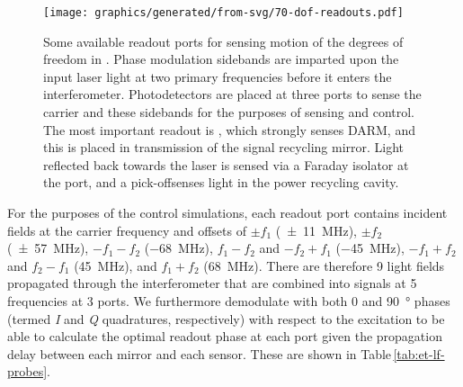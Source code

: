 \begin{figure}
  \centering
  \texttt{[image: graphics/generated/from-svg/70-dof-readouts.pdf]}
  \caption[Some available readout ports for sensing and control in \ETLF{}]{\label{fig:dof-readouts}Some available readout ports for sensing motion of the degrees of freedom in \ETLF{}. Phase modulation sidebands are imparted upon the input laser light at two primary frequencies before it enters the interferometer. Photodetectors are placed at three ports to sense the carrier and these sidebands for the purposes of sensing and control. The most important readout is \AS{}, which strongly senses \gls{DARM}, and this is placed in transmission of the signal recycling mirror. Light reflected back towards the laser is sensed via a Faraday isolator at the \REFL{} port, and a pick-off\textemdash \POP{}\textemdash senses light in the power recycling cavity.}
\end{figure}

For the purposes of the control simulations, each readout port contains incident fields at the carrier frequency and offsets of $\pm f_1$ (\SI{\pm11}{\mega\hertz}), $\pm f_2$ (\SI{\pm57}{\mega\hertz}), $-f_1 - f_2$ (\SI{-68}{\mega\hertz}), $f_1 - f_2$ and $-f_2 + f_1$ (\SI{-45}{\mega\hertz}), $-f_1 + f_2$ and $f_2 - f_1$ (\SI{45}{\mega\hertz}), and $f_1 + f_2$ (\SI{68}{\mega\hertz}). There are therefore \num{9} light fields propagated through the interferometer that are combined into signals at \num{5} frequencies at \num{3} ports. We furthermore demodulate with both \num{0} and \SI{90}{\degree} phases (termed \emph{I} and \emph{Q} quadratures, respectively) with respect to the excitation to be able to calculate the optimal readout phase at each port given the propagation delay between each mirror and each sensor. These are shown in Table\,\ref{tab:et-lf-probes}.

